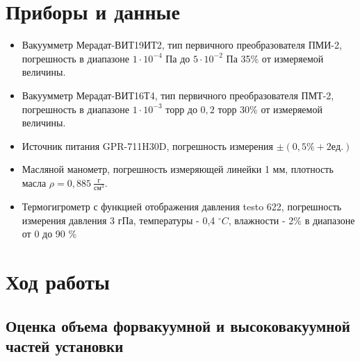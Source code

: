 \documentclass[a4paper,12pt]{article}
\begin{document}
    \newpage
    \section{Приборы и данные}
    \begin{itemize}
        \item Вакуумметр Мерадат-ВИТ19ИТ2, тип первичного преобразователя ПМИ-2, погрешность в диапазоне $1\cdot10^{-4}$ Па до $5\cdot10^{-2}$ Па 35\% от измеряемой величины.
    	\item Вакуумметр Мерадат-ВИТ16Т4, тип первичного преобразователя ПМТ-2, погрешность в диапазоне $1\cdot10^{-3}$ торр до $0,2$ торр 30\% от измеряемой величины.
    	\item Источник питания GPR-711H30D, погрешность измерения $\pm(0,5 \% +2 ед.)$
    	\item Масляной манометр, погрешность измеряющей линейки 1 мм, плотность масла $\rho = 0,885 \ \frac{\text{г}}{\text{см}^3}$.
        \item Термогигрометр с функцией отображения давления testo 622, погрешность измерения давления 3 гПа, температуры - 0,4 $^\circ C$, влажности - 2\% в диапазоне от 0 до 90 \%
    \end{itemize}

    \section{Ход работы}
    \subsection{Оценка объема форвакуумной и высоковакуумной частей установки}
\end{document}
